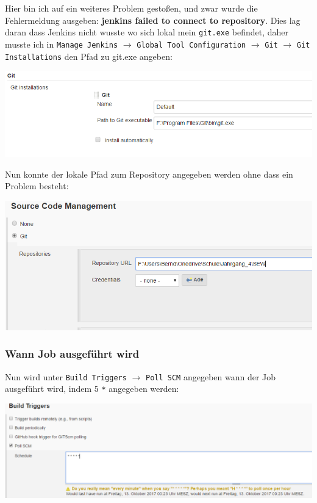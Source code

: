 Hier bin ich auf ein weiteres Problem gestoßen, und zwar wurde die Fehlermeldung ausgeben: \textbf{jenkins failed to connect to repository}. Dies lag daran dass Jenkins nicht wusste wo sich lokal mein \verb|git.exe| befindet, daher musste ich in \verb|Manage Jenkins| $\rightarrow$ \verb|Global Tool Configuration| $\rightarrow$ \verb|Git| $\rightarrow$ \verb|Git Installations| den Pfad zu git.exe angeben:

\begin{minipage}{\linewidth}
	\centering
	\includegraphics[width=0.6\linewidth]{images/path_to_git}
\end{minipage}

Nun konnte der lokale Pfad zum Repository angegeben werden ohne dass ein Problem besteht:

\begin{minipage}{\linewidth}
	\centering
	\includegraphics[width=0.8\linewidth]{images/path_to_repo}
\end{minipage}

\subsubsection{Wann Job ausgeführt wird}
Nun wird unter \verb|Build Triggers| $\rightarrow$ \verb|Poll SCM| angegeben wann der Job ausgeführt wird, indem 5 \verb|*| angegeben werden:

\begin{minipage}{\linewidth}
	\centering
	\includegraphics[width=0.8\linewidth]{images/build_triggers}
\end{minipage}

